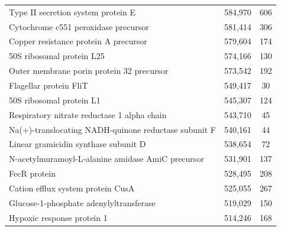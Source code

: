 \begin{singlespace}
\begin{longtable}{p{} cc}
                                                        Type II secretion system protein E &                     584,970 &           606 \\
                                                      Cytochrome c551 peroxidase precursor &                     581,414 &           306 \\
                                                     Copper resistance protein A precursor &                     579,604 &           174 \\
                                                                 50S ribosomal protein L25 &                     574,166 &           130 \\
                                                 Outer membrane porin protein 32 precursor &                     573,542 &           192 \\
                                                                    Flagellar protein FliT &                     549,417 &            30 \\
                                                                  50S ribosomal protein L1 &                     545,307 &           124 \\
                                               Respiratory nitrate reductase 1 alpha chain &                     543,710 &            45 \\
                                      Na(+)-translocating NADH-quinone reductase subunit F &                     540,161 &            44 \\
                                                      Linear gramicidin synthase subunit D &                     538,654 &            72 \\
                                         N-acetylmuramoyl-L-alanine amidase AmiC precursor &                     531,901 &           137 \\
                                                                              FecR protein &                     528,495 &           208 \\
                                                         Cation efflux system protein CusA &                     525,055 &           267 \\
                                                   Glucose-1-phosphate adenylyltransferase &                     519,029 &           150 \\
                                                                Hypoxic response protein 1 &                     514,246 &           168 \\

\end{longtable}
\end{singlespace}
